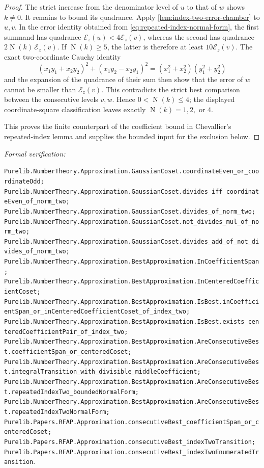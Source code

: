 \documentclass[11pt]{article}
\newcommand{\Norm}[1]{\operatorname{N}\!\left(#1\right)}
\newcommand{\leanref}[1]{\par\smallskip\noindent
  \emph{Formal verification:}\par\nobreak
  {\raggedright\nolinkurl{#1}.\par}}
\begin{document}
\begin{proof}
The strict increase from the denominator level of $u$ to that of $w$ shows
$k\ne0$.  It remains to bound its quadrance.  Apply
\cref{lem:index-two-error-chamber} to $u,v$.  In the error identity obtained
from \eqref{eq:repeated-index-normal-form}, the first summand has quadrance
$\mathcal E_z(u)<4\mathcal E_z(v)$, whereas the second has quadrance
$2\Norm k\,\mathcal E_z(v)$.  If $\Norm k\ge5$, the latter is therefore at
least $10\mathcal E_z(v)$.  The exact two-coordinate Cauchy identity
\[
 (x_1y_1+x_2y_2)^2+(x_1y_2-x_2y_1)^2
   =(x_1^2+x_2^2)(y_1^2+y_2^2)
\]
and the expansion of the quadrance of their sum then show that the error of
$w$ cannot be smaller than $\mathcal E_z(v)$.  This contradicts the strict
best comparison between the consecutive levels $v,w$.  Hence
$0<\Norm k\le4$; the displayed coordinate-square classification leaves
exactly $\Norm k=1,2,$ or $4$.

This proves the finite counterpart of the coefficient bound in Chevallier's
repeated-index lemma and supplies the bounded input for the exclusion below.
\end{proof}

\leanref{Purelib.NumberTheory.Approximation.GaussianCoset.coordinateEven_or_coordinateOdd;
Purelib.NumberTheory.Approximation.GaussianCoset.divides_iff_coordinateEven_of_norm_two;
Purelib.NumberTheory.Approximation.GaussianCoset.divides_of_norm_two;
Purelib.NumberTheory.Approximation.GaussianCoset.not_divides_mul_of_norm_two;
Purelib.NumberTheory.Approximation.GaussianCoset.divides_add_of_not_divides_of_norm_two;
Purelib.NumberTheory.Approximation.BestApproximation.InCoefficientSpan;
Purelib.NumberTheory.Approximation.BestApproximation.InCenteredCoefficientCoset;
Purelib.NumberTheory.Approximation.BestApproximation.IsBest.inCoefficientSpan_or_inCenteredCoefficientCoset_of_index_two;
Purelib.NumberTheory.Approximation.BestApproximation.IsBest.exists_centeredCoefficientPair_of_index_two;
Purelib.NumberTheory.Approximation.BestApproximation.AreConsecutiveBest.coefficientSpan_or_centeredCoset;
Purelib.NumberTheory.Approximation.BestApproximation.AreConsecutiveBest.integralTransition_with_divisible_middleCoefficient;
Purelib.NumberTheory.Approximation.BestApproximation.AreConsecutiveBest.repeatedIndexTwo_boundedNormalForm;
Purelib.NumberTheory.Approximation.BestApproximation.AreConsecutiveBest.repeatedIndexTwoNormalForm;
Purelib.Papers.RFAP.Approximation.consecutiveBest_coefficientSpan_or_centeredCoset;
Purelib.Papers.RFAP.Approximation.consecutiveBest_indexTwoTransition;
Purelib.Papers.RFAP.Approximation.consecutiveBest_indexTwoEnumeratedTransition}
\end{document}
